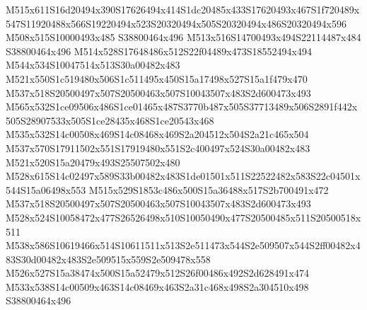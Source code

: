 \documentclass{article}
\begin{document}
\begin{multicols}{2}
M515x611S16d20494x390S17626494x414S1dc20485x433S17620493x467S1f720489x547S11920488x566S19220494x523S20320494x505S20320494x486S20320494x596 M508x515S10000493x485 S38800464x496 M513x516S14700493x494S22114487x484 S38800464x496 M514x528S17648486x512S22f04489x473S18552494x494 M544x534S10047514x513S30a00482x483 M521x550S1c519480x506S1c511495x450S15a17498x527S15a1f479x470 M537x518S20500497x507S20500463x507S10043507x483S2d600473x493 M565x532S1ce09506x486S1ce01465x487S3770b487x505S37713489x506S2891f442x505S28907533x505S1ce28435x468S1ce20543x468 M535x532S14c00508x469S14c08468x469S2a204512x504S2a21c465x504 M537x570S17911502x551S17919480x551S2c400497x524S30a00482x483 M521x520S15a20479x493S25507502x480 M528x615S14c02497x589S33b00482x483S1de01501x511S22522482x583S22c04501x544S15a06498x553 M515x529S1853c486x500S15a36488x517S2b700491x472 M537x518S20500497x507S20500463x507S10043507x483S2d600473x493 M528x524S10058472x477S26526498x510S10050490x477S20500485x511S20500518x511 M538x586S10619466x514S10611511x513S2e511473x544S2e509507x544S2ff00482x483S30d00482x483S2e509515x559S2e509478x558 M526x527S15a38474x500S15a52479x512S26f00486x492S2d628491x474 M533x538S14c00509x463S14c08469x463S2a31c468x498S2a304510x498 S38800464x496










\end{multicols}
\end{document}
